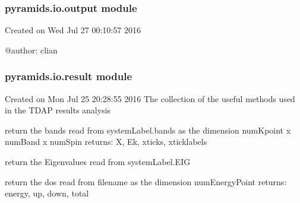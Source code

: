 \documentclass[letterpaper,10pt,english]{sphinxmanual}
\begin{document}
\subsubsection{pyramids.io.output module}
\label{pyramids.io:pyramids-io-output-module}\label{pyramids.io:module-pyramids.io.output}
Created on Wed Jul 27 00:10:57 2016

@author: clian

\begin{fulllineitems}
\label{pyramids.io:pyramids.io.output.writeSiesta}
\end{fulllineitems}



\subsubsection{pyramids.io.result module}
\label{pyramids.io:module-pyramids.io.result}\label{pyramids.io:pyramids-io-result-module}
Created on Mon Jul 25 20:28:55 2016
The collection of the useful methods used in the TDAP results analysis

\begin{fulllineitems}
\label{pyramids.io:pyramids.io.result.getBands}
return the bands read from systemLabel.bands as the dimension numKpoint x numBand x numSpin
returns: X, Ek, xticks, xticklabels

\end{fulllineitems}


\begin{fulllineitems}
\label{pyramids.io:pyramids.io.result.getBerry}
return the Eigenvalues read from systemLabel.EIG

\end{fulllineitems}


\begin{fulllineitems}
\label{pyramids.io:pyramids.io.result.getDOS}
return the dos read from filename as the dimension numEnergyPoint
returns: energy, up, down, total

\end{fulllineitems}
\end{document}
